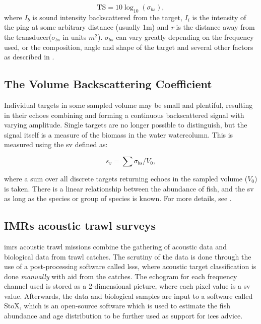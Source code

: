     \begin{equation}
        \textrm{TS} = 10 \log_{10}(\sigma_{bs}),
    \end{equation}
    where $I_{b}$ is sound intensity backscattered from the target, $I_{i}$ is the intensity of the ping at some arbitrary distance (usually 1m) and \textit{r} is the distance away from the transducer($\sigma_{bs}$ in units $m^{2}$). $\sigma_{bs}$ can vary greatly depending on the frequency used, or the composition, angle and shape of the target and several other factors as described in \citet{simmonds2008fisheries}. 

\subsection{The Volume Backscattering Coefficient}
    Individual targets in some sampled volume may be small and plentiful, resulting in their echoes combining and forming a continuous backscattered signal with varying amplitude. Single targets are no longer possible to distinguish, but the signal itself is a measure of the biomass in the water watercolumn. This is measured using the \gls{sv} defined as:
    
    \begin{equation}
        s_{v} = \sum \sigma_{bs} / V_{0},
    \end{equation}
    
    where a sum over all discrete targets returning echoes in the sampled volume ($V_{0}$) is taken. There is a linear relationship between the abundance of fish, and the \gls{sv} as long as the species or group of species is known. For more details, see \citet{simmonds2008fisheries}.

\subsection{IMRs acoustic trawl surveys}
    \gls{imr}s acoustic trawl missions combine the gathering of acoustic data and biological data from trawl catches. The scrutiny of the data is done through the use of a post-processing software called \gls{lsss}, where acoustic target classification is done \textit{manually} with aid from the catches\cite{korneliussen2006large}. The echogram for each frequency channel used is stored as a 2-dimensional picture, where each pixel value is a \gls{sv} value.  Afterwards, the data and biological samples are input to a software called StoX, which is an open-source software which is used to estimate the fish abundance and age distribution to be further used as support for \gls{ices} advice\cite{johnsen2019stox}. \cite{korneliussen2018acoustic}





